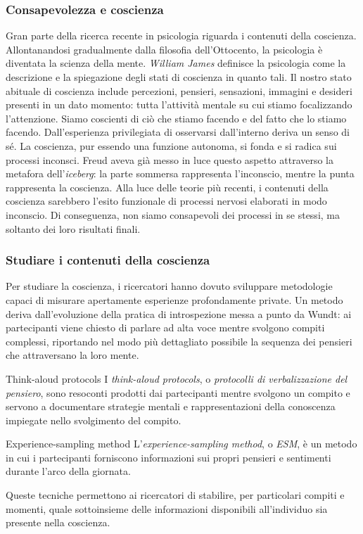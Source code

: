 \documentclass[a4paper]{article}
\begin{document}
\subsubsection{Consapevolezza e coscienza}
Gran parte della ricerca recente in psicologia riguarda i contenuti della coscienza. Allontanandosi gradualmente dalla filosofia dell'Ottocento, la psicologia è diventata la scienza della mente.
\emph{William James} definisce la psicologia come la descrizione e la spiegazione degli stati di coscienza in quanto tali.
Il nostro stato abituale di coscienza include percezioni, pensieri, sensazioni, immagini e desideri presenti in un dato momento: tutta l'attività mentale su cui stiamo focalizzando l'attenzione. Siamo coscienti di ciò che stiamo facendo e del fatto che lo stiamo facendo. Dall'esperienza privilegiata di osservarsi dall'interno deriva un senso di sé.
La coscienza, pur essendo una funzione autonoma, si fonda e si radica sui processi inconsci. Freud aveva già messo in luce questo aspetto attraverso la metafora dell'\emph{iceberg}: la parte sommersa rappresenta l'inconscio, mentre la punta rappresenta la coscienza.
Alla luce delle teorie più recenti, i contenuti della coscienza sarebbero l'esito funzionale di processi nervosi elaborati in modo inconscio. Di conseguenza, non siamo consapevoli dei processi in se stessi, ma soltanto dei loro risultati finali.
\subsubsection{Studiare i contenuti della coscienza}
Per studiare la coscienza, i ricercatori hanno dovuto sviluppare metodologie capaci di misurare apertamente esperienze profondamente private.
Un metodo deriva dall'evoluzione della pratica di introspezione messa a punto da Wundt: ai partecipanti viene chiesto di parlare ad alta voce mentre svolgono compiti complessi, riportando nel modo più dettagliato possibile la sequenza dei pensieri che attraversano la loro mente.
\begin{snippetdefinition}{Think-aloud protocols}
    I \emph{think-aloud protocols}, o \emph{protocolli di verbalizzazione del pensiero}, sono resoconti prodotti dai partecipanti mentre svolgono un compito e servono a documentare strategie mentali e rappresentazioni della conoscenza impiegate nello svolgimento del compito.
\end{snippetdefinition}
\begin{snippetdefinition}{Experience-sampling method}
    L'\emph{experience-sampling method}, o \emph{ESM}, è un metodo in cui i partecipanti forniscono informazioni sui propri pensieri e sentimenti durante l'arco della giornata.
\end{snippetdefinition}
Queste tecniche permettono ai ricercatori di stabilire, per particolari compiti e momenti, quale sottoinsieme delle informazioni disponibili all'individuo sia presente nella coscienza.
\end{document}
